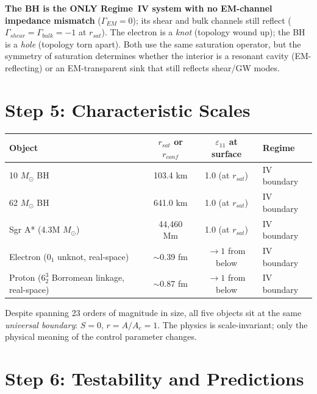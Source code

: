 \noindent
\textbf{The BH is the ONLY Regime~IV system with no EM-channel impedance
mismatch} ($\Gamma_{EM} = 0$); its shear and bulk channels still reflect
($\Gamma_{shear} = \Gamma_{bulk} = -1$ at $r_{sat}$).
The electron is a \textit{knot} (topology wound up);
the BH is a \textit{hole} (topology torn apart).
Both use the same saturation operator, but the symmetry of saturation
determines whether the interior is a resonant cavity (EM-reflecting) or an
EM-transparent sink that still reflects shear/GW modes.

\section{Step 5: Characteristic Scales}

\begin{center}
\begin{tabularx}{\textwidth}{@{}lccX@{}}
\toprule
\textbf{Object} & $r_{sat}$ or $r_{conf}$ & $\varepsilon_{11}$ at surface & Regime \\
\midrule
10 $M_\odot$ BH     & 103.4 km  & 1.0 (at $r_{sat}$) & IV boundary \\
62 $M_\odot$ BH     & 641.0 km  & 1.0 (at $r_{sat}$) & IV boundary \\
Sgr A* (4.3M $M_\odot$) & 44,460 Mm & 1.0 (at $r_{sat}$) & IV boundary \\
Electron ($0_1$ unknot, real-space) & $\sim$0.39 fm & $\to 1$ from below & IV boundary \\
Proton ($6^3_2$ Borromean linkage, real-space)   & $\sim$0.87 fm & $\to 1$ from below & IV boundary \\
\bottomrule
\end{tabularx}
\end{center}

\noindent
Despite spanning 23 orders of magnitude in size, all five objects sit
at the same \textit{universal boundary}: $S = 0$, $r = A/A_c = 1$.
The physics is scale-invariant; only the physical meaning of the
control parameter changes.

\section{Step 6: Testability and Predictions}

